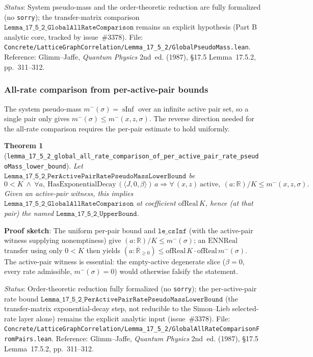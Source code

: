 \documentclass[a4paper,11pt]{article}
\newtheorem{theorem}{Theorem}
\begin{document}
\noindent\textit{Status}: System pseudo-mass and the order-theoretic reduction
are fully formalized (no \texttt{sorry}); the transfer-matrix comparison
$\mathtt{Lemma\_17\_5\_2\_GlobalAllRateComparison}$ remains an explicit
hypothesis (Part B analytic core, tracked by issue~\#3378).
File: \texttt{Concrete/LatticeGraphCorrelation/Lemma\_17\_5\_2/GlobalPseudoMass.lean}.
Reference: Glimm--Jaffe, \emph{Quantum Physics} 2nd~ed. (1987),
\S17.5 Lemma~17.5.2, pp.~311--312.

\subsubsection*{All-rate comparison from per-active-pair bounds}

The system pseudo-mass $m^-(\sigma)=\operatorname{sInf}$ over an infinite active
pair set, so a single pair only gives $m^-(\sigma)\le m^-(x,z,\sigma)$.  The
reverse direction needed for the all-rate comparison requires the per-pair
estimate to hold uniformly.

\begin{theorem}[\texttt{lemma\_17\_5\_2\_global\_all\_rate\_comparison\_of\_per\_active\_pair\_rate\_pseudoMass\_lower\_bound}]
Let $\mathtt{Lemma\_17\_5\_2\_PerActivePairRatePseudoMassLowerBound}$ be
\[
  0<K \ \wedge\ \forall a,\
  \mathrm{HasExponentialDecay}\,(\langle J,0,\beta\rangle)\,a
  \Rightarrow
  \forall\,(x,z)\ \text{active},\ (a:\mathbb{R})/K\le m^-(x,z,\sigma).
\]
Given an active-pair witness, this implies
$\mathtt{Lemma\_17\_5\_2\_GlobalAllRateComparison}$ at coefficient
$\mathrm{ofReal}\,K$, hence (at that pair) the named
$\mathtt{Lemma\_17\_5\_2\_UpperBound}$.
\end{theorem}

\noindent\textbf{Proof sketch}:
The uniform per-pair bound and $\mathtt{le\_csInf}$ (with the active-pair witness
supplying nonemptiness) give $(a:\mathbb{R})/K\le m^-(\sigma)$; an
$\mathrm{ENNReal}$ transfer using only $0<K$ then yields
$(a:\overline{\mathbb{R}}_{\ge0})\le\mathrm{ofReal}\,K\cdot\mathrm{ofReal}\,m^-(\sigma)$.
The active-pair witness is essential: the empty-active degenerate slice
($\beta=0$, every rate admissible, $m^-(\sigma)=0$) would otherwise falsify the
statement.

\noindent\textit{Status}: Order-theoretic reduction fully formalized (no
\texttt{sorry}); the per-active-pair rate bound
$\mathtt{Lemma\_17\_5\_2\_PerActivePairRatePseudoMassLowerBound}$ (the
transfer-matrix exponential-decay step, not reducible to the Simon--Lieb
selected-rate layer alone) remains the explicit analytic input (issue~\#3378).
File:
\texttt{Concrete/LatticeGraphCorrelation/Lemma\_17\_5\_2/GlobalAllRateComparisonFromPairs.lean}.
Reference: Glimm--Jaffe, \emph{Quantum Physics} 2nd~ed. (1987),
\S17.5 Lemma~17.5.2, pp.~311--312.
\end{document}
